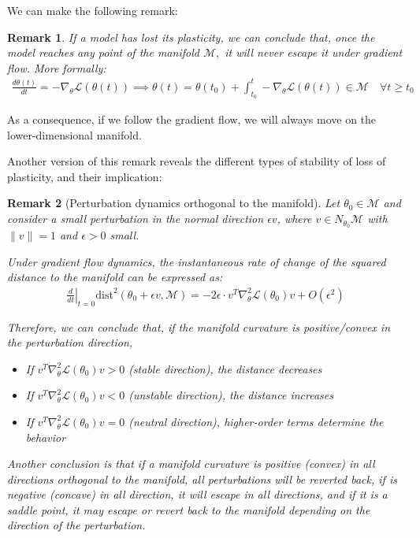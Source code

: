 \documentclass[11pt]{article}
\newtheorem{remark}{Remark}[section]
\begin{document}
We can make the following remark:
\begin{remark}
    If a model has lost its plasticity, we can conclude that, once the model reaches any point of the manifold $\mathcal{M},$ it will never escape it under gradient flow. More formally: 
    \begin{align*}
        \frac{d\theta(t)}{dt} = -\nabla_\theta \mathcal{L}(\theta(t)) \implies \theta(t) = \theta(t_0) + \int_{t_0}^t -\nabla_\theta \mathcal{L}(\theta(t))  \in \mathcal{M}   \quad \forall t \geq t_0
    \end{align*}
\end{remark}
As a consequence, if we follow the gradient flow, we will always move on the lower-dimensional manifold.

Another version of this remark reveals the different types of stability of loss of plasticity, and their implication:

\begin{remark}[Perturbation dynamics orthogonal to the manifold]
    Let $\theta_0 \in \mathcal{M}$ and consider a small perturbation in the normal direction $\epsilon v$, where $v \in N_{\theta_0}\mathcal{M}$ with $\|v\| = 1$ and $\epsilon > 0$ small. 
    
    Under gradient flow dynamics, the instantaneous rate of change of the squared distance to the manifold can be expressed as:
    \begin{align}
        \left.\frac{d}{dt}\right|_{t=0} \text{dist}^2(\theta_0 + \epsilon v, \mathcal{M}) = -2\epsilon \cdot v^T\nabla_{\theta}^2\mathcal{L}(\theta_0)v + O(\epsilon^2)
    \end{align}
    
    Therefore,  we can conclude that, if the manifold curvature is positive/convex in the perturbation direction,  
    \begin{itemize}
        \item If $v^T\nabla_{\theta}^2\mathcal{L}(\theta_0)v > 0$ (stable direction), the distance decreases
        \item If $v^T\nabla_{\theta}^2\mathcal{L}(\theta_0)v < 0$ (unstable direction), the distance increases
        \item If $v^T\nabla_{\theta}^2\mathcal{L}(\theta_0)v = 0$ (neutral direction), higher-order terms determine the behavior
    \end{itemize}
    Another conclusion is that if a manifold curvature is positive (convex) in all directions orthogonal to the manifold, all perturbations will be reverted back, if is negative (concave) in all direction, it will escape in all directions, and if it is a saddle point, it may escape or revert back to the manifold depending on the direction of the perturbation. 
\end{remark}
\end{document}
